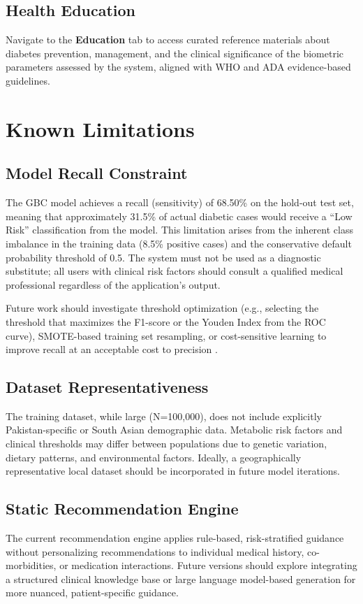 \documentclass[12pt,a4paper]{report}
\begin{document}
\subsection{Health Education}
Navigate to the \textbf{Education} tab to access curated reference materials about diabetes prevention, management, and the clinical significance of the biometric parameters assessed by the system, aligned with WHO and ADA evidence-based guidelines.

\section{Known Limitations}

\subsection{Model Recall Constraint}
The GBC model achieves a recall (sensitivity) of 68.50\% on the hold-out test set, meaning that approximately 31.5\% of actual diabetic cases would receive a ``Low Risk'' classification from the model. This limitation arises from the inherent class imbalance in the training data (8.5\% positive cases) and the conservative default probability threshold of 0.5. The system must not be used as a diagnostic substitute; all users with clinical risk factors should consult a qualified medical professional regardless of the application's output.

Future work should investigate threshold optimization (e.g., selecting the threshold that maximizes the F1-score or the Youden Index from the ROC curve), SMOTE-based training set resampling, or cost-sensitive learning to improve recall at an acceptable cost to precision \cite{geron_ml}.

\subsection{Dataset Representativeness}
The training dataset, while large (N=100,000), does not include explicitly Pakistan-specific or South Asian demographic data. Metabolic risk factors and clinical thresholds may differ between populations due to genetic variation, dietary patterns, and environmental factors. Ideally, a geographically representative local dataset should be incorporated in future model iterations.

\subsection{Static Recommendation Engine}
The current recommendation engine applies rule-based, risk-stratified guidance without personalizing recommendations to individual medical history, co-morbidities, or medication interactions. Future versions should explore integrating a structured clinical knowledge base or large language model-based generation for more nuanced, patient-specific guidance.
\end{document}
